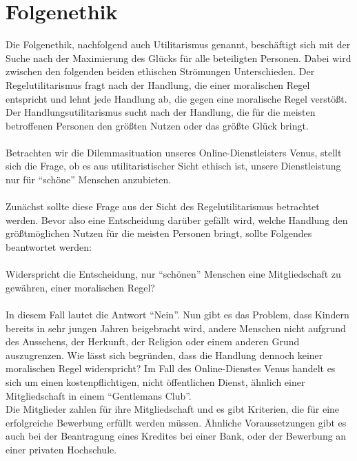 \author{Autor: Leonie Schiburr}
\section{Folgenethik}

Die Folgenethik, nachfolgend auch Utilitarismus genannt, beschäftigt sich mit der Suche nach der Maximierung des Glücks für
alle beteiligten Personen. Dabei wird zwischen den folgenden beiden ethischen Strömungen Unterschieden. Der Regelutilitarismus fragt nach der Handlung, die einer moralischen Regel entspricht und lehnt jede Handlung ab, die gegen eine moralische Regel verstößt. Der Handlungsutilitarismus sucht nach der Handlung, die für die meisten betroffenen Personen den größten Nutzen oder das größte Glück bringt.\\
\\
Betrachten wir die Dilemmasituation unseres Online-Dienstleisters Venus, stellt sich die Frage, ob es aus utilitaristischer Sicht ethisch ist,
unsere Dienstleistung nur für ``schöne'' Menschen anzubieten.\\
\\
Zunächst sollte diese Frage aus der Sicht des Regelutilitarismus betrachtet werden. Bevor also eine Entscheidung darüber gefällt wird, welche Handlung den größtmöglichen Nutzen für die meisten Personen bringt, sollte Folgendes beantwortet werden:\\
\\
Widerspricht die Entscheidung, nur ``schönen'' Menschen eine Mitgliedschaft zu gewähren, einer moralischen Regel?\\
\\
In diesem Fall lautet die Antwort ``Nein''. Nun gibt es das Problem, dass Kindern bereits in sehr jungen Jahren beigebracht wird, andere Menschen nicht aufgrund des Aussehens, der Herkunft, der Religion oder einem anderen Grund auszugrenzen. Wie lässt sich begründen, dass die Handlung dennoch keiner moralischen Regel widerspricht? Im Fall des Online-Dienstes Venus handelt es sich um einen kostenpflichtigen, nicht öffentlichen Dienst, ähnlich einer Mitgliedschaft in einem ``Gentlemans Club''. \\
Die Mitglieder zahlen für ihre Mitgliedschaft und es gibt Kriterien, die für eine erfolgreiche Bewerbung erfüllt werden müssen. Ähnliche Voraussetzungen gibt es auch bei der Beantragung eines Kredites bei einer Bank, oder der Bewerbung an einer privaten Hochschule.\\ 
\\
